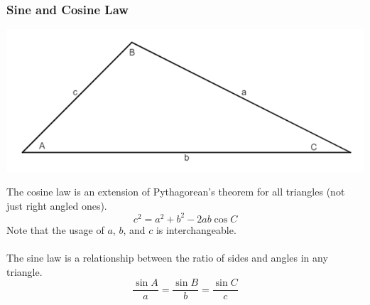 \subsubsection{Sine and Cosine Law}
\centerline{\includegraphics[scale=0.7]{FundamentalsPictures/SineLawTriangle.png}}
The cosine law is an extension of Pythagorean's theorem for all triangles (not just right angled ones).
$$c^2=a^2+b^2-2ab\cos C$$
Note that the usage of $a$, $b$, and $c$ is interchangeable.\\
\\
The sine law is a relationship between the ratio of sides and angles in any triangle.
$$\frac{\sin A}{a}=\frac{\sin B}{b}=\frac{\sin C}{c}$$